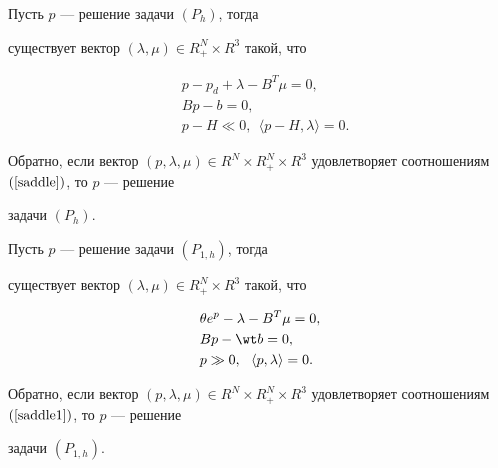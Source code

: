 \begin{assrt}


Пусть $p$ --- решение задачи $(P_h)$, тогда


существует вектор $(\lambda, \mu)\in R^N_{+}\times R^3$ такой, что


\begin{equation}\label{saddle}


\begin{split}


&p-p_d+\lambda-B^T\mu=0,\\


&Bp-b=0,\\


&p-H\ll 0, \ \ \langle p-H, \lambda\rangle=0.


\end{split}


\end{equation}


Обратно, если вектор $(p, \lambda, \mu)\in R^N\times R^N_{+}\times


R^3$ удовлетворяет соотношениям $(\ref{saddle})$, то $p$ --- решение


задачи $(P_h)$.


\end{assrt}





\begin{assrt}


Пусть $p$ --- решение задачи $(P_{1,h})$, тогда


существует вектор $(\lambda, \mu)\in R^N_{+}\times R^3$ такой, что


\begin{equation}\label{saddle1}


\begin{split}


&\theta e^p -\lambda-B^T\mu=0,\\


&Bp-\wt b=0,\\


&p\gg 0, \ \ \langle p, \lambda\rangle=0.


\end{split}


\end{equation}


Обратно, если вектор $(p, \lambda, \mu)\in R^N\times R^N_{+}\times


R^3$ удовлетворяет соотношениям $(\ref{saddle1})$, то $p$ --- решение


задачи $(P_{1,h})$. 


\end{assrt}





